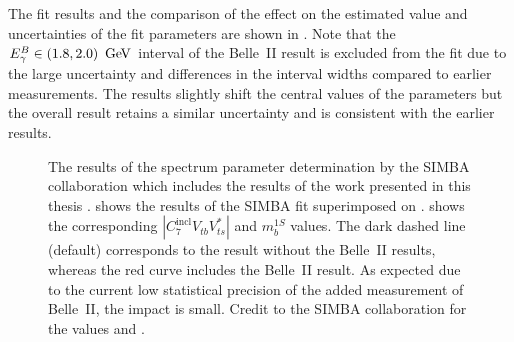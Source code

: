 The fit results and the comparison of the effect on the estimated value and uncertainties of the fit parameters are shown in .
Note that the ${E^B_{\gamma}}\in(1.8,2.0)~\mathrm{\,Ge\kern -0.1em V}$ interval of the Belle~II result is excluded from the fit due to the large uncertainty and differences in the interval widths compared to earlier \BtoXsgamma measurements.
The results slightly shift the central values of the parameters but the overall result retains a similar uncertainty and is consistent with the earlier results.
\begin{figure}[hbtp!]
    \centering
    \caption{\label{fig:simba_c7}
    The results of the \BtoXsgamma spectrum parameter determination by the SIMBA collaboration which includes the results of the work presented in this thesis
    \cite{Bernlochner:2020jlt}.
     shows the results of the SIMBA fit superimposed on .
     shows the corresponding $|C^{\mathrm{incl}}_7V^{}_{tb}V^*_{ts}|$ and $m_b^{1S}$ values.
    The dark dashed line (default) corresponds to the result without the Belle~II results, whereas the red curve includes the Belle~II result.
    As expected due to the current low statistical precision of the added \BtoXsgamma measurement of Belle~II, the impact is small.
    Credit to the SIMBA collaboration for the values and .
    }
\end{figure}

